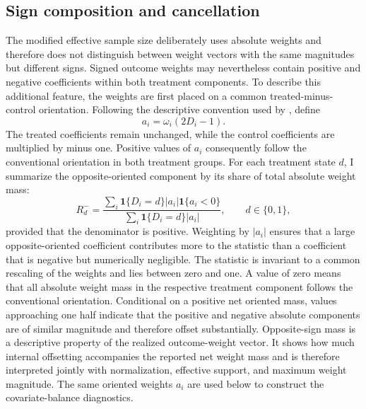 \documentclass[12pt, a4paper, oneside]{article}
\theoremstyle{plain}
\theoremstyle{definition}
\begin{document}
\subsection{Sign composition and cancellation}
\label{subsec:weight_cancellation}

The modified effective sample size deliberately uses absolute weights and
therefore does not distinguish between weight vectors with the same
magnitudes but different signs. Signed outcome weights may nevertheless
contain positive and negative coefficients within both treatment components.
To describe this additional feature, the weights are first placed on a common
treated-minus-control orientation.
Following the descriptive convention used by
\citet[Section~5]{knaus2024treatment}, define
\begin{equation}
    a_i=\omega_i(2D_i-1).
    \label{eq:balance_oriented_weights}
\end{equation}
The treated coefficients remain unchanged, while the control coefficients
are multiplied by minus one. Positive values of \(a_i\) consequently follow
the conventional orientation in both treatment groups.
For each treatment state \(d\), I summarize the opposite-oriented component
by its share of total absolute weight mass:
\begin{equation}
    R_d^{-}
    =
    \frac{
      \sum_i
      \mathbf 1\{D_i=d\}
      |a_i|
      \mathbf 1\{a_i<0\}
    }{
      \sum_i
      \mathbf 1\{D_i=d\}
      |a_i|
    },
    \qquad d\in\{0,1\},
    \label{eq:opposite_sign_mass}
\end{equation}
provided that the denominator is positive. Weighting by \(|a_i|\) ensures
that a large opposite-oriented coefficient contributes more to the statistic
than a coefficient that is negative but numerically negligible.
The statistic is invariant to a common rescaling of the weights and lies
between zero and one. A value of zero means that all absolute weight mass in
the respective treatment component follows the conventional orientation.
Conditional on a positive net oriented mass, values approaching one half
indicate that the positive and negative absolute components are of similar
magnitude and therefore offset substantially. 
Opposite-sign mass is a descriptive property of the realized outcome-weight
vector. It shows
how much internal offsetting accompanies the reported net weight mass and is
therefore interpreted jointly with normalization, effective support, and
maximum weight magnitude. The same oriented weights \(a_i\) are used below to
construct the covariate-balance diagnostics.
\end{document}
